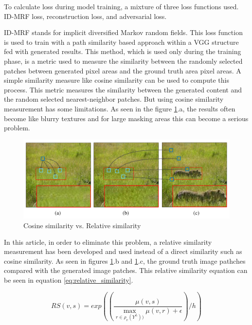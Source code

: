 To calculate loss during model training, a mixture of three loss functions used. ID-MRF loss, reconstruction loss, and adversarial loss.

ID-MRF stands for implicit diversified Markov random fields. This loss function is used to train with a path similarity based approach within a VGG structure fed with generated results. This method, which is used only during the training phase, is a metric used to measure the similarity between the randomly selected patches between generated pixel areas and the ground truth area pixel areas. A simple similarity measure like cosine similarity can be used to compute this process. This metric measures the similarity between the generated content and the random selected nearest-neighbor patches. But using cosine similarity measurement has some limitations. As seen in the figure \ref{fig:cosine_similarity}.a, the results often become like blurry textures and for large masking areas this can become a serious problem.

\begin{figure}[h!]
    \centering
    \includegraphics[width=13cm]{figures/chapter4/cosine_similarity.png}
    \caption{Cosine similarity vs. Relative similarity \cite{inpainting_via_multi_cnn}}
    \label{fig:cosine_similarity}
\end{figure}

In this article, in order to eliminate this problem, a relative similarity measurement has been developed and used instead of a direct similarity such as cosine similarity. As seen in figures \ref{fig:cosine_similarity}.b and \ref{fig:cosine_similarity}.c, the ground truth image pathches compared with the generated image patches. This relative similarity equation can be seen in equation \ref{eq:relative_similarity}.

\begin{equation}
    RS(v, s) = exp((\frac{\mu (v, s)}{\max_{r\in \rho_{v} (Y^{L}))} \mu(v,r) + \epsilon }) / h)
    \label{eq:relative_similarity}
\end{equation}

